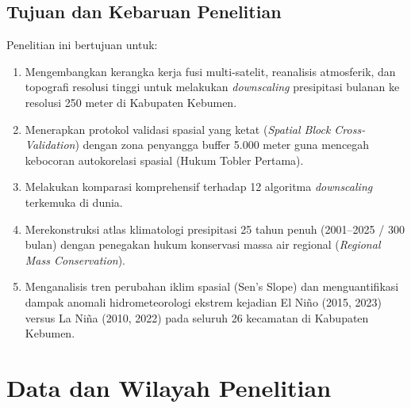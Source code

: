 \documentclass[11pt,a4paper,titlepage]{article}
\begin{document}
\subsection{Tujuan dan Kebaruan Penelitian}
Penelitian ini bertujuan untuk:
\begin{enumerate}
    \item Mengembangkan kerangka kerja fusi multi-satelit, reanalisis atmosferik, dan topografi resolusi tinggi untuk melakukan \textit{downscaling} presipitasi bulanan ke resolusi 250 meter di Kabupaten Kebumen.
    \item Menerapkan protokol validasi spasial yang ketat (\textit{Spatial Block Cross-Validation}) dengan zona penyangga buffer 5.000 meter guna mencegah kebocoran autokorelasi spasial (Hukum Tobler Pertama).
    \item Melakukan komparasi komprehensif terhadap 12 algoritma \textit{downscaling} terkemuka di dunia.
    \item Merekonstruksi atlas klimatologi presipitasi 25 tahun penuh (2001--2025 / 300 bulan) dengan penegakan hukum konservasi massa air regional (\textit{Regional Mass Conservation}).
    \item Menganalisis tren perubahan iklim spasial (Sen's Slope) dan menguantifikasi dampak anomali hidrometeorologi ekstrem kejadian El Niño (2015, 2023) versus La Niña (2010, 2022) pada seluruh 26 kecamatan di Kabupaten Kebumen.
\end{enumerate}

\section{Data dan Wilayah Penelitian}
\end{document}
